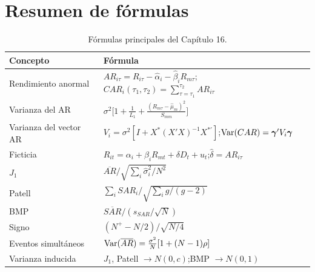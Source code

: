 \section{Resumen de fórmulas}

\begin{table}[H]
\centering\small
\begin{tabular}{@{}ll@{}}
\toprule
Concepto & Fórmula \\
\midrule
Rendimiento anormal & $AR_{i\tau}=R_{i\tau}-\hat\alpha_i-\hat\beta_iR_{m\tau}$;\quad $CAR_i(\tau_1,\tau_2)=\sum_{\tau=\tau_1}^{\tau_2}AR_{i\tau}$ \\
Varianza del AR & $\sigma^2\bigl[1+\frac1{L_1}+\frac{(R_{m\tau}-\hat\mu_m)^2}{S_{mm}}\bigr]$ \\
Varianza del vector AR & $V_i=\sigma^2[I+X^*(X'X)^{-1}X^{*\prime}]$;\quad $\operatorname{Var}(CAR)=\boldsymbol\gamma'V_i\boldsymbol\gamma$ \\
Ficticia & $R_{it}=\alpha_i+\beta_iR_{mt}+\delta D_t+u_t$;\quad $\hat\delta=AR_{i\tau}$ \\
$J_1$ & $\overline{AR}/\sqrt{\sum_i\hat\sigma_i^2/N^2}$ \\
Patell & $\sum_iSAR_i/\sqrt{\sum_ig/(g-2)}$ \\
BMP & $\overline{SAR}/(s_{SAR}/\sqrt N)$ \\
Signo & $(N^+-N/2)/\sqrt{N/4}$ \\
Eventos simultáneos & $\operatorname{Var}(\overline{AR})=\frac{\sigma^2}{N}[1+(N-1)\rho]$ \\
Varianza inducida & $J_1$, Patell $\to N(0,c)$;\quad BMP $\to N(0,1)$ \\
\bottomrule
\end{tabular}
\caption{Fórmulas principales del Capítulo 16.}
\end{table}

